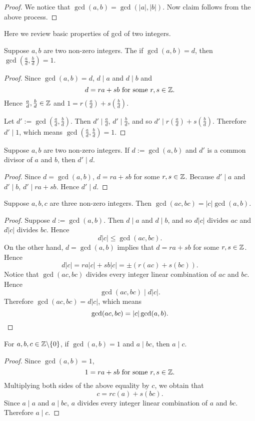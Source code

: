 \begin{proof}
    We notice that $\gcd(a,b)=\gcd(|a|,|b|)$. Now claim
    follows from the above process.
\end{proof}

Here we review basic properties of gcd of two integers.

\begin{theorem}
    Suppose $a,b$ are two non-zero integers. The if $\gcd(a,b)=d$,
    then $\gcd\left(\frac{a}{d},\frac{b}{d}\right)=1$.
\end{theorem}

\begin{proof}
    Since $\gcd(a,b)=d$, $d\mid a$ and $d\mid b$ and
    \[d=ra+sb\text{ for some }r,s\in\mathbb{Z}.\]
    Hence $\frac{a}{d},\frac{b}{d}\in\mathbb{Z}$ and $1=r\left(\frac{a}{d}\right)+s\left(\frac{b}{d}\right)$.

    Let $d':=\gcd\left(\frac{a}{d},\frac{b}{d}\right)$. Then $d'\mid\frac{a}{d}$, $d'\mid\frac{b}{d}$,
    and so $d'\mid r\left(\frac{a}{d}\right)+s\left(\frac{b}{d}\right)$. Therefore
    $d'\mid 1$, which means $\gcd\left(\frac{a}{d},\frac{b}{d}\right)=1$.
\end{proof}

\begin{theorem}
    Suppose $a,b$ are two non-zero integers. If $d:=\gcd(a,b)$
    and $d'$ is a common divisor of $a$ and $b$, then $d'\mid d$.
\end{theorem}

\begin{proof}
    Since $d=\gcd(a,b)$, $d=ra+sb$ for some $r,s\in\mathbb{Z}$.
    Because $d'\mid a$ and $d'\mid b$, $d'\mid ra+sb$. Hence $d'\mid d$.
\end{proof}

\begin{theorem}
    Suppose $a,b,c$ are three non-zero integers.
    Then $\gcd(ac,bc)=|c|\gcd(a,b)$.
\end{theorem}

\begin{proof}
    Suppose $d:=\gcd(a,b)$. Then $d\mid a$ and $d\mid b$,
    and so $d|c|$ divides $ac$ and $d|c|$ divides $bc$. Hence
    \[d|c|\leq\gcd(ac,bc).\]
    On the other hand, $d=\gcd(a,b)$ implies that $d=ra+sb$
    for some $r,s\in\mathbb{Z}$. Hence
    \[d|c|=ra|c|+sb|c|=\pm(r(ac)+s(bc)).\]
    Notice that $\gcd(ac,bc)$ divides every integer linear combination
    of $ac$ and $bc$. Hence
    \[\gcd(ac,bc)\mid d|c|.\]
    Therefore $\gcd(ac,bc)=d|c|$, which means
    \[\gcd(ac,bc)=|c|\gcd(a,b).\qedhere\]
\end{proof}

\begin{theorem}
    For $a,b,c\in\mathbb{Z}\backslash\{0\}$, if $\gcd(a,b)=1$ and $a\mid bc$,
    then $a\mid c$.
\end{theorem}

\begin{proof}
    Since $\gcd(a,b)=1$,
    \[1=ra+sb\text{ for some }r,s\in\mathbb{Z}.\]
    Multiplying both sides of the above equality by $c$,
    we obtain that
    \[c=rc(a)+s(bc).\]
    Since $a\mid a$ and $a\mid bc$, $a$ divides every integer linear
    combination of $a$ and $bc$. Therefore $a\mid c$.
\end{proof}
